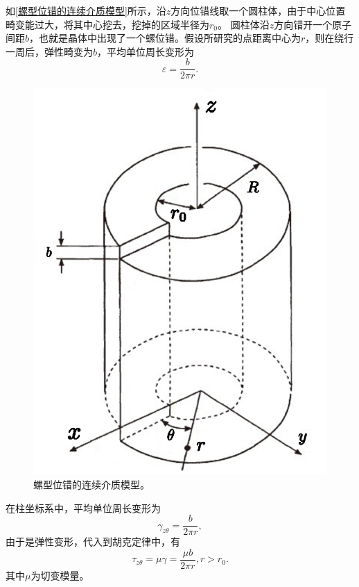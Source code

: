             如\autoref{螺型位错的连续介质模型}所示，沿$z$方向位错线取一个圆柱体，由于中心位置畸变能过大，将其中心挖去，挖掉的区域半径为$r_0$。
            圆柱体沿$z$方向错开一个原子间距$b$，也就是晶体中出现了一个螺位错。假设所研究的点距离中心为$r$，则在绕行一周后，弹性畸变为$b$，平均单位周长变形为
            \begin{equation}
                \varepsilon=\frac{b}{2\pi r}.
            \end{equation}

            \begin{figure}[ht]
                \centering
                \includegraphics[scale=0.5]{fig/continuous_model_of_screw_dislocation.eps}
                \caption{螺型位错的连续介质模型。}
                \label{螺型位错的连续介质模型}
            \end{figure}

            在柱坐标系中，平均单位周长变形为
            \begin{equation}
                \gamma_{z\theta}=\frac{b}{2\pi r},
            \end{equation}
            由于是弹性变形，代入到胡克定律中，有
            \begin{equation}
                \tau_{z\theta}=\mu\gamma=\frac{\mu b}{2\pi r}, r>r_0.
            \end{equation}
            其中$\mu$为切变模量。

